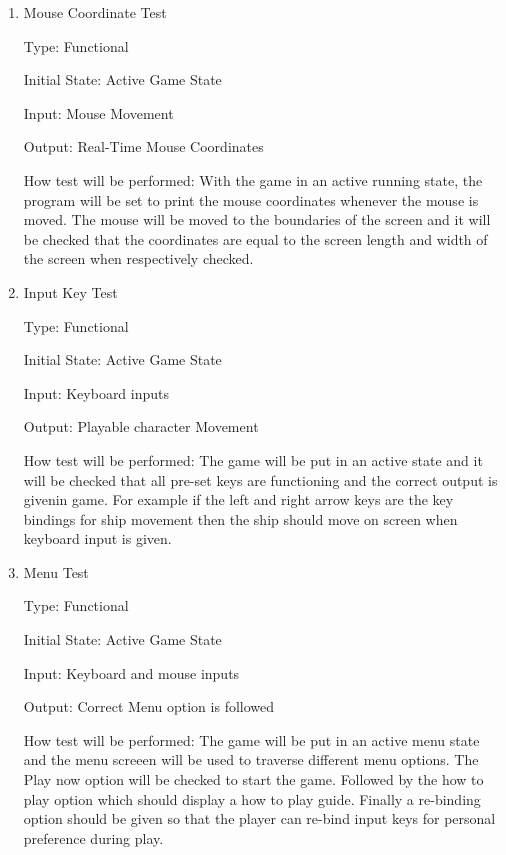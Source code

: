 \documentclass[12pt, titlepage]{article}
\begin{document}
\begin{enumerate}

\item{Mouse Coordinate Test\\}

Type: Functional 
					
Initial State: Active Game State 
					
Input: Mouse Movement 
					
Output: Real-Time Mouse Coordinates 
					
How test will be performed: With the game in an active running state, the
program will be set to print the mouse coordinates whenever the mouse is moved.
The mouse will be moved to the boundaries of the screen and it will be checked
that the coordinates are equal to the screen length and width of the screen
when respectively checked. %
					
\item{Input Key Test\\}

Type: Functional 
					
Initial State: Active Game State 
					
Input: Keyboard inputs
					
Output: Playable character Movement
					
How test will be performed: The game will be put in an active state and it will
be checked that all pre-set keys are functioning and the correct output is
givenin game. For example if the left and right arrow keys are the key bindings
for
ship movement then the ship should move on screen when keyboard input is given.


\item{Menu Test\\}

Type: Functional
					
Initial State: Active Game State
					
Input: Keyboard and mouse inputs 
					
Output: Correct Menu option is followed 
					
How test will be performed: The game will be put in an active menu state and
the menu%
screeen will be used to traverse different menu options. The Play now
option will be checked to start the game. Followed by the how to play option
which should display a how to play guide. Finally a re-binding option should be
given so that the player can re-bind input keys for personal preference during
play.

\end{enumerate}
\end{document}
